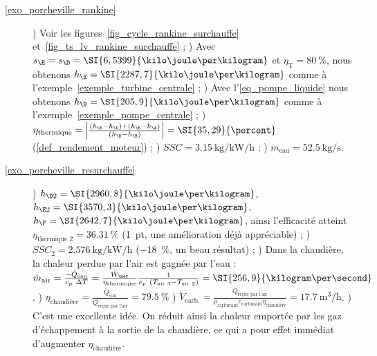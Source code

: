 \exercisesolutionpage
\titreresultats
	\linktosolutionsblurb
	
	\begin{description}
		\item [\ref{exo_porcheville_rankine}] 
						) Voir les figures~\ref{fig_cycle_rankine_surchauffe} et~\ref{fig_ts_lv_rankine_surchauffe} ;
						) Avec $s_\E = s_\D = \SI{6,5399}{\kilo\joule\per\kilogram}$ et $\eta_\text{T} = \SI{80}{\percent}$, nous obtenons $h_\E = \SI{2287,7}{\kilo\joule\per\kilogram} $ comme à l’exemple~\ref{exemple_turbine_centrale} ;
						) Avec l’\cref{eq_pompe_liquide} nous obtenons $h_\B = \SI{205,9}{\kilo\joule\per\kilogram}$ comme à l’exemple~\ref{exemple_pompe_centrale} ;
						) $\eta_\text{thermique} = \left|\frac{(h_\E - h_\D) + (h_\B - h_\A)}{(h_\D - h_\B)}\right| = \SI{35,29}{\percent}$ (\ref{def_rendement_moteur}) ;
						) $SSC = \SI[per-mode = symbol]{3,15}{\kilogram\per\kilo\watt\per\hour}$ ;
						) $\dot{m}_\text{eau} = \SI{52,5}{\kilogram\per\second}$.
		\item [\ref{exo_porcheville_resurchauffe}] 
						) $h_{\D2} = \SI{2960,8}{\kilo\joule\per\kilogram}$, $h_{\E2} = \SI{3570,3}{\kilo\joule\per\kilogram}$, $h_\F = \SI{2642,7}{\kilo\joule\per\kilogram}$, ainsi l’efficacité atteint $\eta_\text{thermique 2} = \SI{36,31}{\percent}$ (\SI{+1}{pt}, une amélioration déjà appréciable) ;
						) $SSC_2 = \SI[per-mode = symbol]{2,576}{\kilogram\per\kilo\watt\per\hour}$ (\SI{-18}{\percent}, un beau résultat) ;
						) Dans la chaudière, la chaleur perdue par l’air est gagnée par l’eau : $\dot m_\text{air} = \frac{-\dot Q_\text{eau}}{c_p \ \Delta T} = \frac{\dot W_\net}{\eta_\text{thermique}} \frac{1}{c_p \ (T_\text{air 3} - T_\text{air 2})}	 = \SI{256,9}{\kilogram\per\second}$.
						) $\eta_\text{chaudière} = \frac{\dot Q_\text{eau}}{\dot Q_\text{reçue par l’air}} = \SI{79,5}{\percent}$ 
						) $\dot{V}_\text{carb.} = \frac{\dot Q_\text{reçue par l’air}}{\rho_\text{carburant} c_\text{carburant} \eta_\text{chaudière}} = \SI{17,7}{\metre\cubed\per\hour}$.
						) C’est une excellente idée. On réduit ainsi la chaleur emportée par les gaz d’échappement à la sortie de la chaudière, ce qui a pour effet immédiat d’augmenter $\eta_\text{chaudière}$.
						

\end{description}
